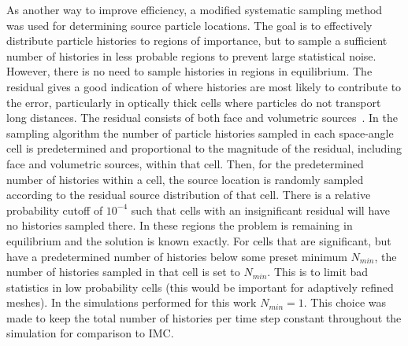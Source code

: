 \documentclass[12pt]{article}
\begin{document}
\begin{center}
As another way to improve efficiency, a modified systematic
sampling
method~\cite{shultis_mc} was used for determining source particle locations.  The goal is to effectively distribute particle
histories to regions of importance, but to sample a sufficient number of histories in
less probable regions to prevent large statistical noise.  However, there is no need
to sample histories in regions in equilibrium.
The residual gives a good indication of where
histories are most likely to contribute to the error, particularly in optically thick
cells where particles do not transport long distances.  The residual consists of both face
and volumetric sources~\cite{jake}.   
In the sampling algorithm the number of particle histories sampled in
each space-angle cell is predetermined and proportional to the magnitude of the
residual, including face and volumetric sources, within that cell.  Then, for the predetermined number of histories within a cell, the source
location is randomly sampled according to the residual source distribution of that
cell.  There is
a relative probability cutoff of $10^{-4}$ such that cells with an insignificant
residual will have no histories sampled there. In these regions the problem is
remaining in equilibrium and the solution is known exactly.  
For cells that are significant, but have a predetermined number of histories below some preset
minimum $N_{min}$, the number of histories sampled in that cell is set to
$N_{min}$. This is to limit
bad statistics in low probability cells (this would be important for adaptively
refined meshes).  In the simulations performed for this work $N_{min}=1$.  This
choice was made to keep the total number of histories per time step
constant throughout the simulation for comparison to IMC. 


\end{center}
\end{document}
